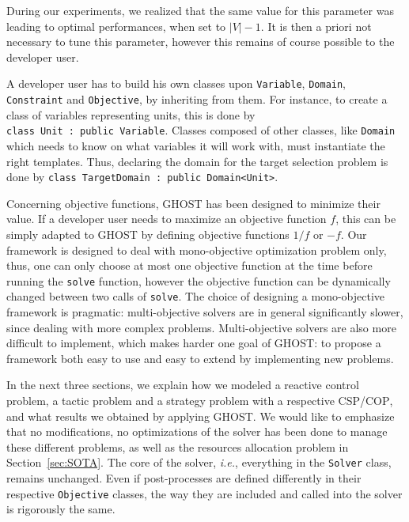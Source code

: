 \documentclass[journal]{IEEEtran}
\newcommand{\csp}{\textsc{CSP}\xspace}
\newcommand{\cop}{\textsc{COP}\xspace}
\newcommand{\ghost}{\textsc{GHOST}\xspace}
\newcommand{\ie}{\textit{i.e.}}
\begin{document}
During  our experiments,  we realized  that  the same  value for  this
parameter was  leading to optimal  performances, when set  to $|V|-1$.
It is then a priori not necessary to tune this parameter, however this
remains of course possible to the developer user.

A developer user has to  build his own classes upon \texttt{Variable},
\texttt{Domain},   \texttt{Constraint}   and  \texttt{Objective},   by
inheriting from  them. For  instance, to create  a class  of variables
representing        units,        this        is        done        by
\texttt{class~Unit~:~public~Variable}.   Classes   composed  of  other
classes, like \texttt{Domain} which needs to know on what variables it
will work with, must instantiate  the right templates. Thus, declaring
the   domain   for  the   target   selection   problem  is   done   by
\texttt{class~TargetDomain~:~public~Domain<Unit>}.

Concerning objective  functions, \ghost has been  designed to minimize
their  value.  If  a developer  user  needs to  maximize an  objective
function $f$,  this can be  simply adapted  to \ghost by  defining objective  functions  $1/f$ or $-f$.   Our  framework is  designed  to  deal  with
mono-objective optimization problem only, thus, one can only choose at
most  one   objective  function  at   the  time  before   running  the
\texttt{solve}  function,  however  the   objective  function  can  be
dynamically changed between two calls of \texttt{solve}. The choice of
designing  a  mono-objective   framework  is  pragmatic:  multi-objective
solvers are in  general significantly slower, since  dealing with more
complex problems.  Multi-objective solvers  are also more difficult to
implement, which makes harder one goal  of \ghost: to propose a framework
both easy to use and easy to extend by implementing new problems.

In  the next  three sections,  we explain  how we  modeled a  reactive
control  problem, a  tactic  problem  and a  strategy  problem with  a
respective \csp/\cop, and what results we obtained by applying \ghost.
We would like to emphasize that no modifications, no optimizations of the
solver has been  done to manage these different problems, as well as the resources allocation problem in Section~\ref{sec:SOTA}.  The core of
the  solver, \ie,  everything  in the  \texttt{Solver} class,  remains
unchanged.  Even  if post-processes  are defined differently  in their
respective \texttt{Objective}  classes, the way they  are included and
called into the solver is rigorously the same.
\end{document}
